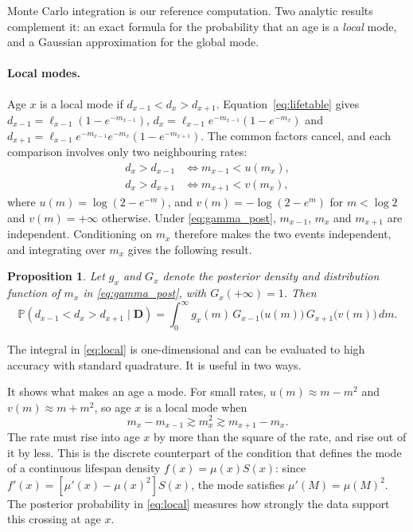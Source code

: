 \documentclass[12pt, letterpaper]{article}
\newtheorem{proposition}{Proposition}
\begin{document}
Monte Carlo integration is our reference computation. Two analytic results complement it: an exact formula for the probability that an age is a \emph{local} mode, and a Gaussian approximation for the global mode.

\paragraph{Local modes.} Age $x$ is a local mode if $d_{x-1} < d_x > d_{x+1}$. Equation~\eqref{eq:lifetable} gives $d_{x-1} = \ell_{x-1}(1 - e^{-m_{x-1}})$, $d_x = \ell_{x-1} e^{-m_{x-1}}(1 - e^{-m_x})$ and $d_{x+1} = \ell_{x-1} e^{-m_{x-1}} e^{-m_x} (1 - e^{-m_{x+1}})$. The common factors cancel, and each comparison involves only two neighbouring rates:
\begin{align}
d_x > d_{x-1} &\iff m_{x-1} < u(m_x), \label{eq:left}\\
d_x > d_{x+1} &\iff m_{x+1} < v(m_x), \label{eq:right}
\end{align}
where $u(m) = \log(2 - e^{-m})$, and $v(m) = -\log(2 - e^{m})$ for $m < \log 2$ and $v(m) = +\infty$ otherwise. Under \eqref{eq:gamma_post}, $m_{x-1}$, $m_x$ and $m_{x+1}$ are independent. Conditioning on $m_x$ therefore makes the two events independent, and integrating over $m_x$ gives the following result.

\begin{proposition}
\label{prop:local}
Let $g_x$ and $G_x$ denote the posterior density and distribution function of $m_x$ in \eqref{eq:gamma_post}, with $G_x(+\infty) = 1$. Then
\begin{equation}
\mathbb{P}(d_{x-1} < d_x > d_{x+1} \mid \bm{D}) 
 = \int_0^\infty g_x(m)\, G_{x-1}\big(u(m)\big)\, G_{x+1}\big(v(m)\big)\, dm .
\label{eq:local}
\end{equation}
\end{proposition}

The integral in \eqref{eq:local} is one-dimensional and can be evaluated to high accuracy with standard quadrature. It is useful in two ways.

It shows what makes an age a mode. For small rates, $u(m) \approx m - m^2$ and $v(m) \approx m + m^2$, so age $x$ is a local mode when
\begin{equation*}
m_x - m_{x-1} \gtrsim m_x^2 \gtrsim m_{x+1} - m_x .
\end{equation*}
The rate must rise into age $x$ by more than the square of the rate, and rise out of it by less. This is the discrete counterpart of the condition that defines the mode of a continuous lifespan density $f(x) = \mu(x) S(x)$: since $f'(x) = [\mu'(x) - \mu(x)^2] S(x)$, the mode satisfies $\mu'(M) = \mu(M)^2$. The posterior probability in \eqref{eq:local} measures how strongly the data support this crossing at age $x$.
\end{document}
